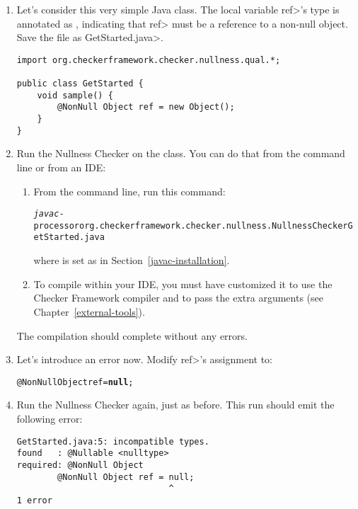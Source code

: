\begin{enumerate}
\item
  Let's consider this very simple Java class.  The local variable \<ref>'s type is
  annotated as , indicating that \<ref> must be a reference to a
  non-null object.  Save the file as \<GetStarted.java>.

\begin{Verbatim}
import org.checkerframework.checker.nullness.qual.*;

public class GetStarted {
    void sample() {
        @NonNull Object ref = new Object();
    }
}
\end{Verbatim}

\item
  Run the Nullness Checker on the class.
  You can do that from the command line or from an IDE:

\begin{enumerate}
\item
  From the command line, run this command:

\begin{smaller}
\begin{alltt}
  \emph{javac} -processor org.checkerframework.checker.nullness.NullnessChecker GetStarted.java
\end{alltt}
\end{smaller}

\noindent
where \emph{} is set as in Section~\ref{javac-installation}.

\item
  To compile within your IDE, you must have customized it to use the
  Checker Framework compiler and to pass the extra arguments (see
  Chapter~\ref{external-tools}).
\end{enumerate}

  The compilation should complete without any errors.

\item
  Let's introduce an error now.  Modify \<ref>'s assignment to:
\begin{alltt}
  @NonNull Object ref = \textbf{null};
\end{alltt}

\item
  Run the Nullness Checker again, just as before.  This run should emit
  the following error:
\begin{Verbatim}
GetStarted.java:5: incompatible types.
found   : @Nullable <nulltype>
required: @NonNull Object
        @NonNull Object ref = null;
                              ^
1 error
\end{Verbatim}

\end{enumerate}


